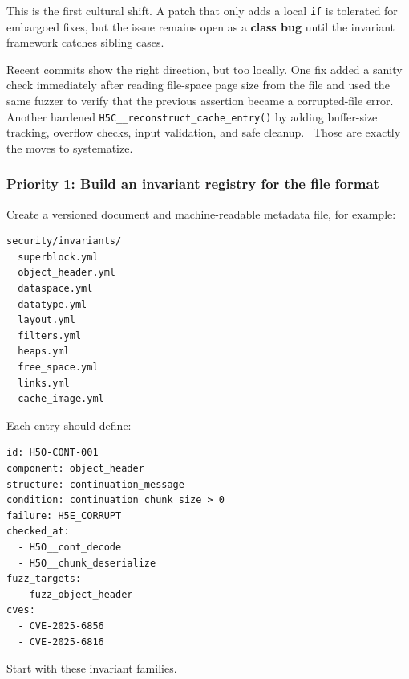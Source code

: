 \documentclass[../main.tex]{subfiles}
\begin{document}
This is the first cultural shift. A patch that only adds a local \texttt{if}
is tolerated for embargoed fixes, but the issue remains open as a
\textbf{class bug} until the invariant framework catches sibling cases.

Recent commits show the right direction, but too locally. One fix
added a sanity check immediately after reading file-space page size
from the file and used the same fuzzer to verify that the previous
assertion became a corrupted-file error.~\cite{commit_804f3ba}
Another hardened \texttt{H5C\_\_reconstruct\_cache\_entry()} by adding
buffer-size tracking, overflow checks, input validation, and safe cleanup.~\cite{commit_3914bb7}
Those are exactly the moves to systematize.

\subsubsection*{Priority 1: Build an invariant registry for the file format}

Create a versioned document and machine-readable metadata file, for example:

\begin{verbatim}
security/invariants/
  superblock.yml
  object_header.yml
  dataspace.yml
  datatype.yml
  layout.yml
  filters.yml
  heaps.yml
  free_space.yml
  links.yml
  cache_image.yml
\end{verbatim}

Each entry should define:

\begin{verbatim}
id: H5O-CONT-001
component: object_header
structure: continuation_message
condition: continuation_chunk_size > 0
failure: H5E_CORRUPT
checked_at:
  - H5O__cont_decode
  - H5O__chunk_deserialize
fuzz_targets:
  - fuzz_object_header
cves:
  - CVE-2025-6856
  - CVE-2025-6816
\end{verbatim}

Start with these invariant families.

\begingroup
\small
\setlength{\tabcolsep}{3pt}
\renewcommand{\arraystretch}{1.15}

\setlength{\LTleft}{-0.7in}
\setlength{\LTright}{-0.7in}
\end{document}
